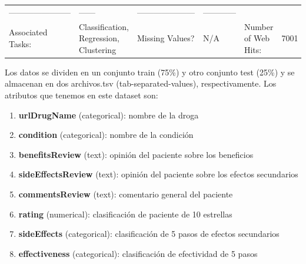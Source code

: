 \documentclass[spanish,]{article}
\providecommand{\tightlist}{%
  \setlength{\itemsep}{0pt}\setlength{\parskip}{0pt}}
\begin{document}
\begin{longtable}[]{@{}llllll@{}}
\begin{minipage}[t]{0.15\columnwidth}
-----------------------\strut
\end{minipage} & \begin{minipage}[t]{0.04\columnwidth}\raggedright\strut
------\strut
\end{minipage} & \begin{minipage}[t]{0.13\columnwidth}\raggedright\strut
---------------------\strut
\end{minipage} & \begin{minipage}[t]{0.08\columnwidth}\raggedright\strut
------------\strut
\end{minipage}\tabularnewline
\begin{minipage}[t]{0.18\columnwidth}\raggedright\strut
Associated Tasks:\strut
\end{minipage} & \begin{minipage}[t]{0.25\columnwidth}\raggedright\strut
Classification, Regression, Clustering\strut
\end{minipage} & \begin{minipage}[t]{0.15\columnwidth}\raggedright\strut
Missing Values?\strut
\end{minipage} & \begin{minipage}[t]{0.04\columnwidth}\raggedright\strut
N/A\strut
\end{minipage} & \begin{minipage}[t]{0.13\columnwidth}\raggedright\strut
Number of Web Hits:\strut
\end{minipage} & \begin{minipage}[t]{0.08\columnwidth}\raggedright\strut
7001\strut
\end{minipage}\tabularnewline
\bottomrule
\end{longtable}

Los datos se dividen en un conjunto train (75\%) y otro conjunto test
(25\%) y se almacenan en dos archivos.tsv (tab-separated-values),
respectivamente. Los atributos que tenemos en este dataset son:

\begin{enumerate}
\def\labelenumi{\arabic{enumi}.}
\tightlist
\item
  \textbf{urlDrugName} (categorical): nombre de la droga
\item
  \textbf{condition} (categorical): nombre de la condición
\item
  \textbf{benefitsReview} (text): opinión del paciente sobre los
  beneficios
\item
  \textbf{sideEffectsReview} (text): opinión del paciente sobre los
  efectos secundarios
\item
  \textbf{commentsReview} (text): comentario general del paciente
\item
  \textbf{rating} (numerical): clasificación de paciente de 10 estrellas
\item
  \textbf{sideEffects} (categorical): clasificación de 5 pasos de
  efectos secundarios
\item
  \textbf{effectiveness} (categorical): clasificación de efectividad de
  5 pasos
\end{enumerate}
\end{document}
